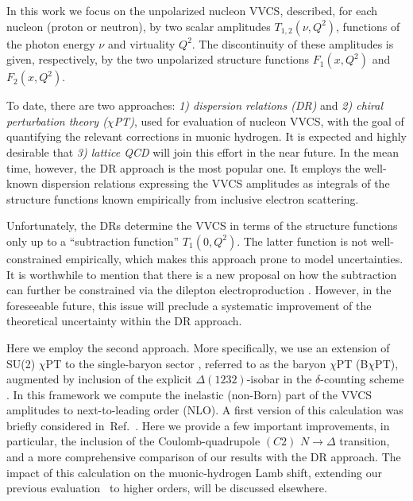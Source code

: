 \documentclass[12pt,preprint,tightenlines,
showpacs,preprintnumbers,amsmath,amssymb,
a4paper,nofootinbib]{revtex4-2}
\def\de{\delta} \def\De{\Delta}
\begin{document}
In this work we focus on the unpolarized nucleon 
VVCS, described, for each nucleon (proton or neutron), by two scalar amplitudes $T_{1,2}(\nu,Q^2)$,
functions of the photon energy $\nu$ and virtuality $Q^2$.
The  discontinuity of these amplitudes is
given, respectively, by the two unpolarized structure functions $F_1(x,Q^2)$ and
$F_{2}(x, Q^2)$.

To date, there are two approaches: 
\textit{1) dispersion relations (DR)} and 
\textit{2) chiral perturbation theory ($
\chi$PT)}, used for evaluation
of nucleon VVCS, with the goal of quantifying the relevant corrections in muonic hydrogen.
It is expected and  highly desirable that 
\textit{3) lattice QCD} will join this effort in the near future. 
In the mean time, however, the DR approach is the most popular one.
It employs the well-known dispersion relations expressing 
the VVCS amplitudes as integrals of the structure
functions known empirically from inclusive electron scattering. 


Unfortunately, the DRs determine the VVCS in terms of the structure functions only up to a ``subtraction  function'' $T_1(0,Q^2)$. 
The latter function is not well-constrained empirically, which
makes this approach prone to model uncertainties. It is worthwhile to mention that there is a
new proposal on how the subtraction can further be constrained
via the dilepton electroproduction \cite{Pauk:2020gjv}. However, in the foreseeable future,
this issue will preclude a systematic improvement of the theoretical uncertainty within the DR approach. 



Here we employ the second approach. More specifically, we use an extension of SU(2) $\chi$PT \cite{Weinberg:1978kz,Gasser:1983yg} to the single-baryon sector \cite{Gasser:1987rb,Gegelia:1999gf,Fuchs:2003qc}, referred to as the baryon $\chi$PT (B$\chi$PT), augmented by inclusion 
of the explicit $\Delta(1232)$-isobar in the $\de$-counting scheme
\cite{Pascalutsa:2003aa}. 
In this framework we compute the inelastic (non-Born) part of the
VVCS amplitudes to next-to-leading order (NLO).
A first version of this calculation was briefly considered in~Ref.~\cite{Lensky:2014dda}. Here we provide a few important improvements, in particular, the inclusion of the Coulomb-quadrupole $(C2)$ $N\to \Delta$ transition, and a more comprehensive comparison of our results with the DR approach.
The impact of this
calculation on the muonic-hydrogen Lamb shift, extending
our previous evaluation~\cite{Alarcon:2013cba} to higher orders, will be discussed elsewhere.
\end{document}
